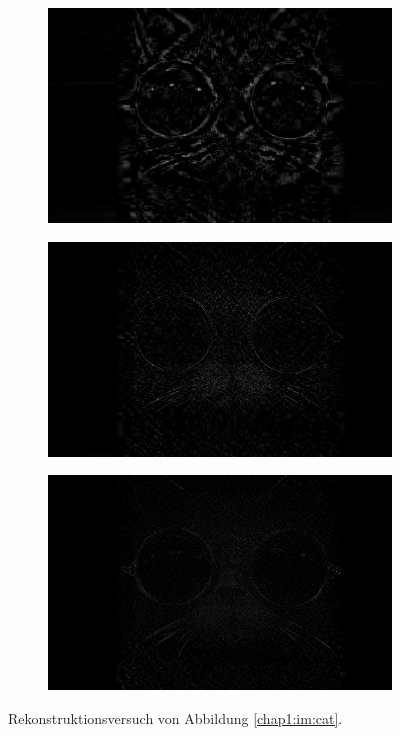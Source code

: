 \begin{figure}[h!]
\center
\begin{subfigure}[c]{.3\textwidth}
\includegraphics[width=.9\linewidth]{images/Cat10-30}
\end{subfigure}
\begin{subfigure}[c]{.3\textwidth}
\includegraphics[width=.9\linewidth]{images/Cat40-90}
\end{subfigure}
\begin{subfigure}[c]{.3\textwidth}
\includegraphics[width=.9\linewidth]{images/Cat100-400}
\end{subfigure}

\caption{Rekonstruktionsversuch von Abbildung \ref{chap1:im:cat}.}\label{chap1:im:catty}
\end{figure}

